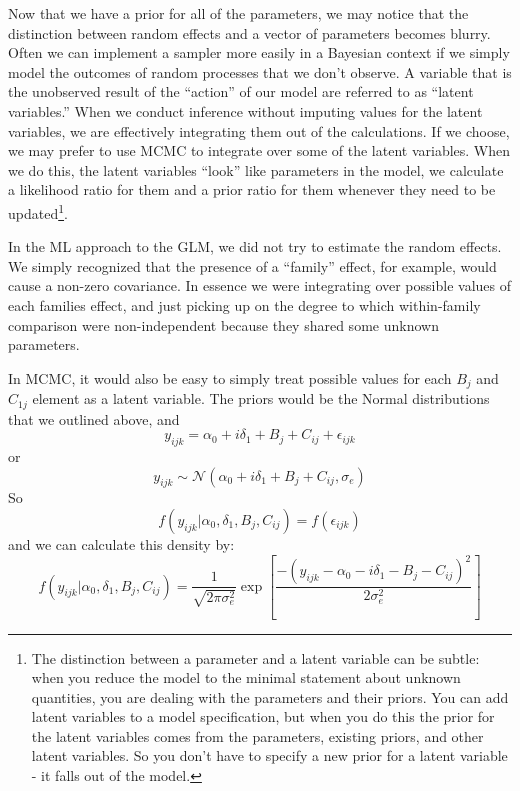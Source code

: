 \documentclass[11pt]{article}
\begin{document}
Now that we have a prior for all of the parameters, we may notice that the distinction between random effects and a vector of parameters becomes blurry.
Often we can implement a sampler more easily in a Bayesian context if we simply model the outcomes of random processes that we don't observe.
A variable that is the unobserved result of the ``action'' of our model are referred to as ``latent variables.''
When we conduct inference without imputing values for the latent variables, we are effectively integrating them out of the calculations.
If we choose, we may prefer to use MCMC to integrate over some of the latent variables.
When we do this, the latent variables ``look'' like parameters in the model, we calculate a likelihood ratio for them and a prior ratio for them whenever they need to be updated\footnote{The distinction between a parameter and a latent variable can be subtle: when you reduce the model to the minimal statement about unknown quantities, you are dealing with the parameters and their priors.  You can add latent variables to a model specification, but when you do this the prior for the latent variables comes from the parameters, existing priors, and other latent variables.  So you don't have to specify a new prior for a latent variable - it falls out of the model.}.

In the ML approach to the GLM, we did not try to estimate the random effects.
We simply recognized that the presence of a ``family'' effect, for example, would cause a non-zero covariance.
In essence we were integrating over possible values of each families effect, and just picking up on the degree to which within-family comparison were non-independent because they shared some unknown parameters.

In MCMC, it would also be easy to simply treat possible values for each $B_j$ and $C_{1j}$ element as a latent variable.
The priors would be the Normal distributions that we outlined above, and 
$$y_{ijk} = \alpha_0 + i\delta_1 + B_j + C_{ij} + \epsilon_{ijk}$$ 
or 
$$y_{ijk} \sim {\mathcal N}(\alpha_0 + i\delta_1 + B_j + C_{ij} , \sigma_e)$$ 
So
$$f(y_{ijk}|\alpha_0, \delta_1, B_j, C_{ij}) = f(\epsilon_{ijk})$$
and we can calculate this density by:
$$ f(y_{ijk}|\alpha_0, \delta_1, B_j, C_{ij}) = \frac{1}{\sqrt{2\pi\sigma_e^2}}\exp\left[{\frac{-\left(y_{ijk}-\alpha_0 - i\delta_1 - B_j - C_{ij}\right)^2}{2\sigma_e^2}}\right]$$
\end{document}
